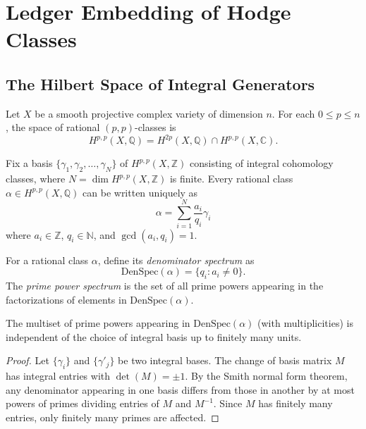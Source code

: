 \section{Ledger Embedding of Hodge Classes}
\label{sec:ledger-embedding}

\subsection{The Hilbert Space of Integral Generators}

Let $X$ be a smooth projective complex variety of dimension $n$. For each $0 \leq p \leq n$, the space of rational $(p,p)$-classes is
\[
H^{p,p}(X,\mathbb{Q}) = H^{2p}(X,\mathbb{Q}) \cap H^{p,p}(X,\mathbb{C}).
\]

\begin{definition}
Fix a basis $\{\gamma_1, \gamma_2, \ldots, \gamma_N\}$ of $H^{p,p}(X,\mathbb{Z})$ consisting of integral cohomology classes, where $N = \dim H^{p,p}(X,\mathbb{Z})$ is finite. Every rational class $\alpha \in H^{p,p}(X,\mathbb{Q})$ can be written uniquely as
\[
\alpha = \sum_{i=1}^N \frac{a_i}{q_i} \gamma_i
\]
where $a_i \in \mathbb{Z}$, $q_i \in \mathbb{N}$, and $\gcd(a_i, q_i) = 1$.
\end{definition}

\begin{definition}
For a rational class $\alpha$, define its \emph{denominator spectrum} as
\[
\text{DenSpec}(\alpha) = \{q_i : a_i \neq 0\}.
\]
The \emph{prime power spectrum} is the set of all prime powers appearing in the factorizations of elements in $\text{DenSpec}(\alpha)$.
\end{definition}

\begin{lemma}
\label{lem:basis-indep}
The multiset of prime powers appearing in $\text{DenSpec}(\alpha)$ (with multiplicities) is independent of the choice of integral basis up to finitely many units.
\end{lemma}

\begin{proof}
Let $\{\gamma_i\}$ and $\{\gamma'_j\}$ be two integral bases. The change of basis matrix $M$ has integral entries with $\det(M) = \pm 1$. By the Smith normal form theorem, any denominator appearing in one basis differs from those in another by at most powers of primes dividing entries of $M$ and $M^{-1}$. Since $M$ has finitely many entries, only finitely many primes are affected.
\end{proof}

